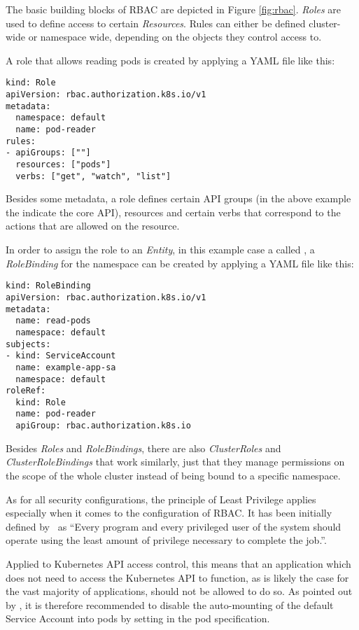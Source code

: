 The basic building blocks of \ac{RBAC} are depicted in Figure \ref{fig:rbac}. \textit{Roles} are used to define access to certain \textit{Resources}. Rules can either be defined cluster-wide or namespace wide, depending on the objects they control access to.

A role that allows reading pods is created by applying a YAML file like this: 

\begin{verbatim}
kind: Role
apiVersion: rbac.authorization.k8s.io/v1
metadata:
  namespace: default
  name: pod-reader
rules:
- apiGroups: [""]
  resources: ["pods"]
  verbs: ["get", "watch", "list"]
\end{verbatim}

Besides some metadata, a role defines certain API groups (in the above example the  indicate the core API), resources and certain verbs that correspond to the actions that are allowed on the resource. 

In order to assign the role to an \textit{Entity}, in this example case a  called , a \textit{RoleBinding} for the namespace  can be created by applying a YAML file like this:

\begin{verbatim}
kind: RoleBinding
apiVersion: rbac.authorization.k8s.io/v1
metadata:
  name: read-pods
  namespace: default
subjects:
- kind: ServiceAccount
  name: example-app-sa 
  namespace: default
roleRef:
  kind: Role
  name: pod-reader
  apiGroup: rbac.authorization.k8s.io
\end{verbatim}

Besides \textit{Roles} and \textit{RoleBindings}, there are also \textit{ClusterRoles} and \textit{ClusterRoleBindings} that work similarly, just that they manage permissions on the scope of the whole cluster instead of being bound to a specific namespace.

As for all security configurations, the principle of Least Privilege applies especially when it comes to the configuration of \ac{RBAC}. It has been initially defined by~\textcite{leastPrivilege} as \enquote{Every program and every privileged user of the system should operate using the least amount of privilege necessary to complete the job.}. 

Applied to Kubernetes API access control, this means that an application which does not need to access the Kubernetes API to function, as is likely the case for the vast majority of applications, should not be allowed to do so. As pointed out by \textcite{kubernetessecurity}, it is therefore recommended to disable the auto-mounting of the default Service Account into pods by setting  in the pod specification. 



